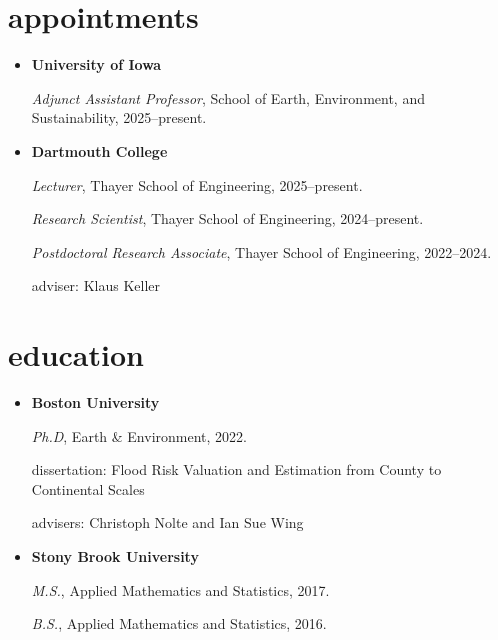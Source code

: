 \documentclass[10pt,oneside]{article}
\begin{document}
\section{appointments}

\mbox{}\vspace{-\dimexpr\baselineskip\relax}

\begin{itemize}[label={}]
  
  \item \textbf{University of Iowa}
        
        \textit{Adjunct Assistant Professor}, School of Earth, Environment, and Sustainability, 2025--present.
        
        
        
  \item \textbf{Dartmouth College}
        
        \textit{Lecturer}, Thayer School of Engineering, 2025--present.
        
        
        \textit{Research Scientist}, Thayer School of Engineering, 2024--present.
        
        
        \textit{Postdoctoral Research Associate}, Thayer School of Engineering, 2022--2024.
        
        adviser: Klaus Keller
        
        
        
\end{itemize}


\section{education}

\mbox{}\vspace{-\dimexpr\baselineskip\relax}

\begin{itemize}[label={}]
  
  \item \textbf{Boston University}
        
        \textit{Ph.D}, Earth \& Environment, 2022.
        
        
        dissertation: Flood Risk Valuation and Estimation from County to Continental Scales
        
        advisers: Christoph Nolte and Ian Sue Wing
        
        
  \item \textbf{Stony Brook University}
        
        \textit{M.S.}, Applied Mathematics and Statistics, 2017.
        
        \textit{B.S.}, Applied Mathematics and Statistics, 2016.
        
        
        
\end{itemize}
\end{document}
